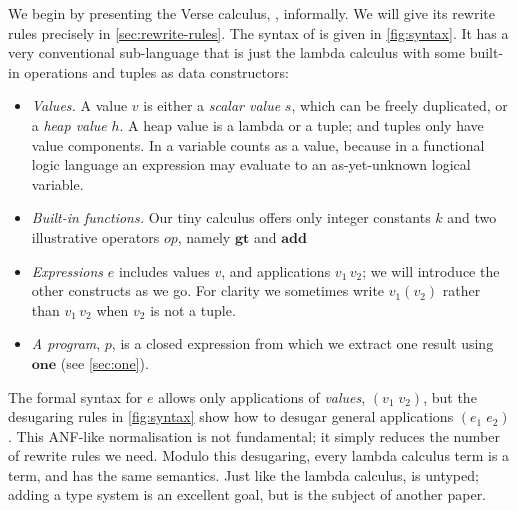 \documentclass[acmsmall,review,anonymous,dvipsnames]{acmart}
\newcommand{\Varid}[1]{\mathit{#1}}
\newcommand{\lennart}[1]{{\color{dkcyan} [{LA}: #1]}}
\newcommand{\lennart}[1]{}
\begin{document}
We begin by presenting the Verse calculus, \versecalc, informally.  We will give its
rewrite rules precisely in \cref{sec:rewrite-rules}.
The syntax of \versecalc{} is given in \cref{fig:syntax}.
It has a very conventional sub-language that is just the lambda calculus with
some built-in operations and tuples as data constructors:
\begin{itemize}
\item \emph{Values.}  A value \ensuremath{\Varid{v}} is either a \emph{scalar value} \ensuremath{\Varid{s}}, which can be freely duplicated,
  or a \emph{heap value} \ensuremath{\Varid{h}}.  A heap value is a lambda or a tuple; and tuples only have value components.
  In \versecalc{} a variable counts as a value, because in a functional logic language an expression
  may evaluate to an as-yet-unknown logical variable.
\item \emph{Built-in functions.}
  Our tiny calculus offers only integer constants \ensuremath{\Varid{k}} and two illustrative operators \ensuremath{\Varid{op}}, namely \ensuremath{\textbf{gt}} and \ensuremath{\textbf{add}}
\item \emph{Expressions} \ensuremath{\Varid{e}} includes values \ensuremath{\Varid{v}}, and applications \ensuremath{\Varid{v}_{\mathrm{1}}\,\Varid{v}_{\mathrm{2}}}; we will
  introduce the other constructs as we go.
For clarity we sometimes write \ensuremath{\Varid{v}_{\mathrm{1}}(\Varid{v}_{\mathrm{2}})} rather than \ensuremath{\Varid{v}_{\mathrm{1}}\,\Varid{v}_{\mathrm{2}}} when \ensuremath{\Varid{v}_{\mathrm{2}}} is not a tuple.
\item \emph{A program}, \ensuremath{\Varid{p}}, is a closed expression from which we extract one result using \ensuremath{\textbf{one}} (see \cref{sec:one}).
\end{itemize}
The formal syntax for \ensuremath{\Varid{e}} allows only applications of \emph{values}, \ensuremath{(\Varid{v}_{\mathrm{1}}\;\Varid{v}_{\mathrm{2}})}, but the desugaring
rules in \cref{fig:syntax} show how to desugar general applications \ensuremath{(\Varid{e}_{\mathrm{1}}\;\Varid{e}_{\mathrm{2}})}. This ANF-like
normalisation is not fundamental; it simply reduces the number of rewrite rules we need.
Modulo this desugaring,
every lambda calculus term is a \versecalc{} term,
and has the same semantics. Just like the lambda calculus, \versecalc{} is untyped;
adding a type system is an excellent goal, but is the subject of another paper.
\end{document}
